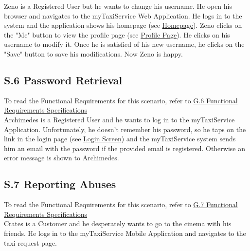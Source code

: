 		Zeno is a Registered User but he wants to change his username. He open his browser and navigates to the myTaxiService Web Application. He logs in to the system and the application shows his homepage (see \hyperref[chome_m]{Homepage}). Zeno clicks on the "Me" button to view the profile page (see \hyperref[cpersonalPage_m]{Profile Page}). He clicks on his username to modify it. Once he is satisfied of his new username, he clicks on the "Save" button to save his modifications. Now Zeno is happy.

		\subsection{S.6 Password Retrieval}\label{sec:PasswordRetrievalScenario}
		To read the Functional Requirements for this scenario, refer to \hyperref[sec:frs6]{G.6 Functional Requirements Specifications}\\

		Archimedes is a Registered User and he wants to log in to the myTaxiService Application. Unfortunately, he doesn't remember his password, so he taps on the link in the login page (see \hyperref[login_m]{Login Screen}) and the myTaxiService system sends him an email with the password if the provided email is registered. Otherwise an error message is shown to Archimedes.

		\subsection{S.7 Reporting Abuses}\label{sec:ReportingAbusesScenario}
		To read the Functional Requirements for this scenario, refer to \hyperref[sec:frs7]{G.7 Functional Requirements Specifications}\\

		Crates is a Customer and he desperately wants to go to the cinema with his friends. He logs in to the myTaxiService Mobile Application and navigates to the taxi request page.
